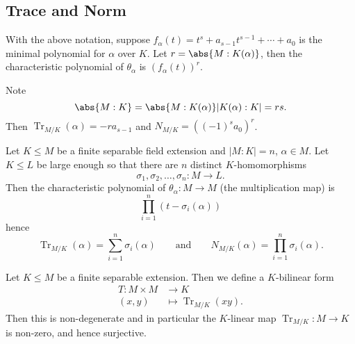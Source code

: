 \documentclass{article}
\DeclareMathOperator{\Tr}{Tr}
\begin{document}
\subsection{Trace and Norm}

\begin{nthm}\label{thm:2.19}
    With the above notation, suppose $f_\alpha(t) = t^s + a_{s-1} t^{s-1} + \dotsb + a_0$ is the minimal polynomial for $\alpha$ over $K$.
    Let $r = \abs{M:K(\alpha)}$, then the characteristic polynomial of $\theta_\alpha$ is $(f_\alpha(t))^r$.

    Note \begin{equation*}\abs{M:K} = \abs{M:K(\alpha)} |K(\alpha) : K| = rs.\end{equation*}
    Then $\Tr_{M/K} (\alpha) = -r a_{s-1}$ and $N_{M/K} = ((-1)^s a_0)^r$.
\end{nthm}

\begin{nthm}\label{thm:2.20}
    Let $K \leq M$ be a finite separable field extension and $|M:K| = n$, $\alpha \in M$.
    Let $K \leq L$ be large enough so that there are $n$ distinct $K$-homomorphisms
    \begin{equation*}
        \sigma_1, \sigma_2, \dotsc, \sigma_n: M \longrightarrow L.
    \end{equation*}
    Then the characteristic polynomial of $\theta_\alpha:M \to M$ (the multiplication map) is
    \begin{equation*}
        \prod_{i=1}^n (t-\sigma_i(\alpha))
    \end{equation*}
    hence
    \begin{equation*}
        \Tr_{M/K} (\alpha) = \sum_{i=1}^n \sigma_i(\alpha) \qquad \text{and} \qquad N_{M/K}(\alpha) = \prod_{i=1}^n \sigma_i(\alpha).
    \end{equation*}
\end{nthm}


\begin{nthm}\label{thm:2.21}
    Let $K \leq M$ be a finite separable extension.
    Then we define a $K$-bilinear form
    \begin{align*}
        T: M \times M &\rightarrow K \\
        (x, y) &\longmapsto \Tr_{M/K} (xy).
    \end{align*}
    Then this is non-degenerate and in particular the $K$-linear map $\Tr_{M/K}:M \to K$ is non-zero, and hence surjective.
\end{nthm}
\end{document}
